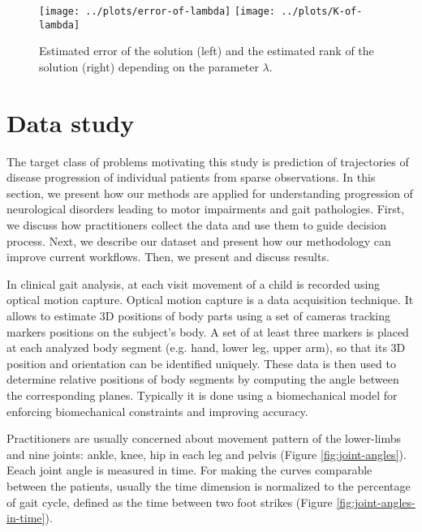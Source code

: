 \documentclass[preprint]{imsart}
\numberwithin{equation}{section}
\theoremstyle{plain}
\begin{document}
\begin{figure}[h!]
  \texttt{[image: ../plots/error-of-lambda]}
  \texttt{[image: ../plots/K-of-lambda]}
  \caption{Estimated error of the solution (left) and the estimated rank of the solution (right) depending on the parameter $\lambda$.}
  \label{fig:estimated-rank}
\end{figure}



\section{Data study}

The target class of problems motivating this study is prediction of trajectories of disease progression of individual patients from sparse observations. In this section, we present how our methods are applied for understanding progression of neurological disorders leading to motor impairments and gait pathologies. First, we discuss how practitioners collect the data and use them to guide decision process. Next, we describe our dataset and present how our methodology can improve current workflows. Then, we present and discuss results.

In clinical gait analysis, at each visit movement of a child is recorded using optical motion capture. Optical motion capture is a data acquisition technique. It allows to estimate 3D positions of body parts using a set of cameras tracking markers positions on the subject's body. A set of at least three markers is placed at each analyzed body segment (e.g. hand, lower leg, upper arm), so that its 3D position and orientation can be identified uniquely. These data is then used to determine relative positions of body segments by computing the angle between the corresponding planes. Typically it is done using a biomechanical model for enforcing biomechanical constraints and improving accuracy.

Practitioners are usually concerned about movement pattern of the lower-limbs and nine joints: ankle, knee, hip in each leg and pelvis (Figure \ref{fig:joint-angles}). Eeach joint angle is measured in time. For making the curves comparable between the patients, usually the time dimension is normalized to the percentage of gait cycle, defined as the time between two foot strikes (Figure \ref{fig:joint-angles-in-time}).
\end{document}
